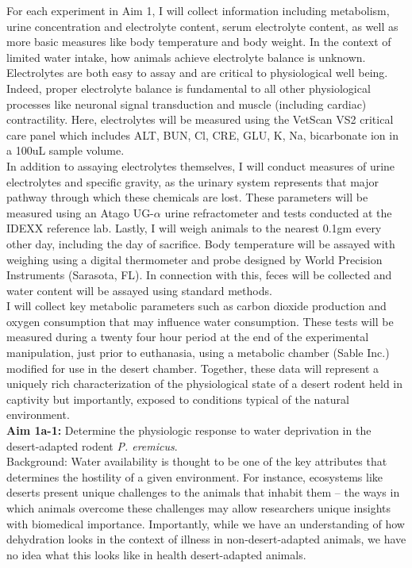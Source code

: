 \documentclass[11pt]{article}
\begin{document}
For each experiment in Aim 1, I will collect information including metabolism, urine concentration and electrolyte content, serum electrolyte content, as well as more basic measures like body temperature and body weight. In the context of limited water intake, how animals achieve electrolyte balance is unknown. Electrolytes are both easy to assay and are critical to physiological well being. Indeed, proper electrolyte balance is fundamental to all other physiological processes like neuronal signal transduction and muscle (including cardiac) contractility. Here, electrolytes will be measured using the VetScan VS2 critical care panel which includes ALT, BUN, Cl, CRE, GLU, K, Na, bicarbonate ion in a 100uL sample volume. \\

In addition to assaying electrolytes themselves, I will conduct measures of urine electrolytes and specific gravity, as the urinary system represents that major pathway through which these chemicals are lost. These parameters will be measured using an Atago UG-$\alpha$ urine refractometer and tests conducted at the IDEXX reference lab. Lastly, I will weigh animals to the nearest 0.1gm every other day, including the day of sacrifice. Body temperature will be assayed with weighing using a digital thermometer and probe designed by World Precision Instruments (Sarasota, FL). In connection with this, feces will be collected and water content will be assayed using  standard methods. \\

I will collect key metabolic parameters such as carbon dioxide production and oxygen consumption that may influence water consumption. These tests will be measured during a twenty four hour period at the end of the experimental manipulation, just prior to euthanasia, using a metabolic chamber (Sable Inc.) modified for use in the desert chamber. Together, these data will represent a uniquely rich characterization of the physiological state of a desert rodent held in captivity but importantly, exposed to conditions typical of the natural environment. \\

\noindent \textbf{Aim 1a-1:} Determine the physiologic response to water deprivation in the desert-adapted rodent \textit{P. eremicus}. \\


Background: Water availability is thought to be one of the key attributes that determines the hostility of a given environment. For instance, ecosystems like deserts present unique challenges to the animals that inhabit them -- the ways in which animals overcome these challenges may allow researchers unique insights with biomedical importance. Importantly, while we have an understanding of how dehydration looks in the context of illness in non-desert-adapted animals, we have no idea what this looks like in health desert-adapted animals. \\
\end{document}
